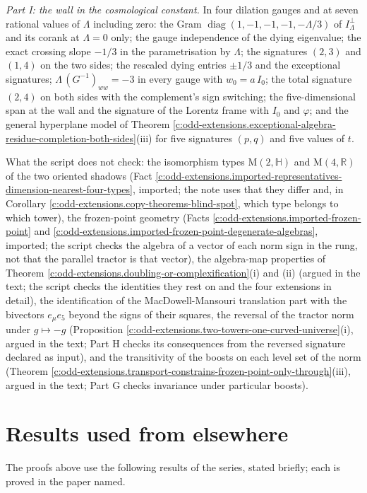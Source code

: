 \documentclass[11pt]{article}
\theoremstyle{definition}
\theoremstyle{plain}
\providecommand{\HH}{}\renewcommand{\HH}{\mathbb{H}}
\providecommand{\Mat}{}\renewcommand{\Mat}{\mathrm{M}}
\providecommand{\R}{}\renewcommand{\R}{\mathbb{R}}
\begin{document}
\emph{Part I: the wall in the cosmological constant.} In four dilation gauges and at seven rational values of $\Lambda$ including zero: the Gram $\operatorname{diag}(1,-1,-1,-1,-\Lambda/3)$ of $I_{\Lambda}^{\perp}$ and its corank at $\Lambda = 0$ only; the gauge independence of the dying eigenvalue; the exact crossing slope $-1/3$ in the parametrisation by $\Lambda$; the signatures $(2,3)$ and $(1,4)$ on the two sides; the rescaled dying entries $\pm 1/3$ and the exceptional signatures; $\Lambda\,(G^{-1})_{ww} = -3$ in every gauge with $w_{0} = a\,I_{0}$; the total signature $(2,4)$ on both sides with the complement's sign switching; the five-dimensional span at the wall and the signature of the Lorentz frame with $I_{0}$ and $\varphi$; and the general hyperplane model of Theorem \ref{c:odd-extensions.exceptional-algebra-residue-completion-both-sides}(iii) for five signatures $(p,q)$ and five values of $t$.

What the script does not check: the isomorphism types $\Mat(2,\HH)$ and $\Mat(4,\R)$ of the two oriented shadows (Fact \ref{c:odd-extensions.imported-representatives-dimension-nearest-four-types}, imported; the note uses that they differ and, in Corollary \ref{c:odd-extensions.copy-theorems-blind-spot}, which type belongs to which tower), the frozen-point geometry (Facts \ref{c:odd-extensions.imported-frozen-point} and \ref{c:odd-extensions.imported-frozen-point-degenerate-algebras}, imported; the script checks the algebra of a vector of each norm sign in the rung, not that the parallel tractor is that vector), the algebra-map properties of Theorem \ref{c:odd-extensions.doubling-or-complexification}(i) and (ii) (argued in the text; the script checks the identities they rest on and the four extensions in detail), the identification of the MacDowell-Mansouri translation part with the bivectors $e_{\mu}e_{5}$ beyond the signs of their squares, the reversal of the tractor norm under $g \mapsto -g$ (Proposition \ref{c:odd-extensions.two-towers-one-curved-universe}(i), argued in the text; Part H checks its consequences from the reversed signature declared as input), and the transitivity of the boosts on each level set of the norm (Theorem \ref{c:odd-extensions.transport-constrains-frozen-point-only-through}(iii), argued in the text; Part G checks invariance under particular boosts).

\section{Results used from elsewhere}
The proofs above use the following results of the series, stated briefly; each is proved in the paper named.
\end{document}
